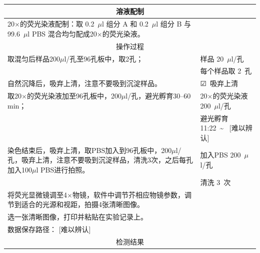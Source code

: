 \documentclass[UTF8,10pt,a4paper,fontset=fandol]{ctexart}
\newcommand{\fieldvalue}[1]{#1}
\newcommand{\handwritten}[1]{#1}
\newcommand{\checkboxfield}[1]{\ifstrequal{#1}{checked}{☑}{\ifstrequal{#1}{unclear}{?}{☐}}}
\begin{document}
\begin{center}
\begin{tabular}{|p{8.0cm}|p{8.0cm}|}
\hline
\multicolumn{2}{c}{溶液配制}\\
\hline
20$\times$的荧光染液配制：取
\fieldvalue{\handwritten{0.2}}\ $\mu$l 组分 A 和
\fieldvalue{\handwritten{0.2}}\ $\mu$l 组分 B 与
\fieldvalue{\handwritten{99.6}}\ $\mu$l PBS 混合均匀配成20$\times$的荧光染液。 &
\\
\hline
\multicolumn{2}{c}{操作过程}\\
\hline
取混匀后样品200$\mu$l/孔至96孔板中，取2孔； &
样品
\fieldvalue{\handwritten{20}}\ $\mu$l/孔\\
& 每个样品取
\fieldvalue{\handwritten{2}}\ 孔\\
\hline
自然沉降后，吸弃上清，注意不要吸到沉淀样品。 &
\fieldvalue{\checkboxfield{checked}}\ 吸弃上清\\
\hline
取20$\times$的荧光染液加至96孔板中，200$\mu$l/孔，避光孵育30--60 min； &
20$\times$的荧光染液
\fieldvalue{\handwritten{200}}\ $\mu$l/孔\\
& 避光孵育
\fieldvalue{\handwritten{11:22}}\ \textasciitilde\
\fieldvalue{\handwritten{[难以辨认]}}\\
\hline
染色结束后，吸弃上清，取PBS加入到96孔板中，200$\mu$l/孔，吸弃上清，注意不要吸到沉淀样品，清洗3次，之后每孔加入100$\mu$l PBS进行拍照。 &
加入PBS
\fieldvalue{\handwritten{200}}\ $\mu$l/孔\\
& 清洗
\fieldvalue{\handwritten{3}}\ 次\\
\hline
将荧光显微镜调至4$\times$物镜，软件中调节芥相应物镜参数，调节到适合的光源和视距，拍摄4张清晰图像。 &
\\
\hline
选一张清晰图像，打印并粘贴在实验记录上。 &
\\
\hline
\multicolumn{2}{l|}{数据保存路径：%
\fieldvalue{\handwritten{[难以辨认]}}}\\
\hline
\multicolumn{2}{c}{检测结果}\\
\hline
\end{tabular}
\end{center}
\end{document}
